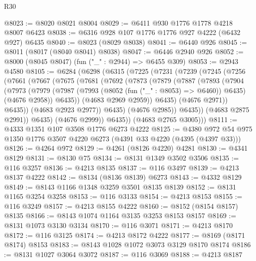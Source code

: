 \begin{lexlean}{R30}
\begin{coremodule}
{{{{{@8023 := @8020 @8021 @8004
@8029 := @6411 @930 @1776 @1778 @4218 @8007 @6423
@8038 := @6316 @928 @107 @1776 @1776 @927 @4222 (@6432 @927) @6435
@8040 := @8023 (@8029 @8038)
@8041 := @6440 @926
@8045 := @8011 (@8017 (@8040 @8041) @8038)
@8047 := @6446 @2940 @926
@8052 := @8000 (@8045 @8047) (fun ("_" : @2944) => @6455 @309)
@8053 := @2943 @4580
@8105 := @6284
    (@6298
      (@6315
        (@7225
          (@7231
            (@7239
              (@7245
                (@7256
                  (@7661
                    (@7667
                      (@7675
                        (@7681
                          (@7692
                            (@7873
                              (@7879
                                (@7887
                                  (@7893
                                    (@7904
                                      (@7973
                                        (@7979
                                          (@7987
                                            (@7993 (@8052 (fun ("_" : @8053) => @6460)) @6435)
                                            (@4676 @2958))
                                          @6435))
                                      (@4683 @2969 @2959))
                                    @6435)
                                  (@4676 @2971))
                                @6435))
                            (@4683 @2923 @2977))
                          @6435)
                        (@4676 @2985))
                      @6435))
                  (@4683 @2875 @2991))
                @6435)
              (@4676 @2999))
            @6435))
        (@4683 @2765 @3005)))
@8111 := @4333 @1351 @107 @3508 @1776 @6273 @4222
@8125 := @4380 @972 @54 @975 @1350 @1776 @3507 @4220 @6273 (@4391 @33 @4220 (@4395 (@4397 @33)))
@8126 := @4264 @972
@8129 := @4261 (@8126 @4220) @4281
@8130 := @4341 @8129
@8131 := @8130 @75
@8134 := @8131 @1349 @3502 @3506
@8135 := @116 @3257
@8136 := @4213 @8135
@8137 := @116 @3497
@8139 := @4213 @8137 @4222
@8142 := @8134 (@8136 @8139) @6273
@8143 := @4332 @8129
@8149 := @8143 @1166 @1348 @3259 @3501 @8135 @8139
@8152 := @8131 @1165 @3254 @3258
@8153 := @116 @3133
@8154 := @4213 @8153
@8155 := @116 @3249
@8157 := @4213 @8155 @4222
@8160 := @8152 (@8154 @8157) @8135
@8166 := @8143 @1074 @1164 @3135 @3253 @8153 @8157
@8169 := @8131 @1073 @3130 @3134
@8170 := @116 @3071
@8171 := @4213 @8170
@8172 := @116 @3125
@8174 := @4213 @8172 @4222
@8177 := @8169 (@8171 @8174) @8153
@8183 := @8143 @1028 @1072 @3073 @3129 @8170 @8174
@8186 := @8131 @1027 @3064 @3072
@8187 := @116 @3069
@8188 := @4213 @8187
}}}}}
\end{coremodule}
\end{lexlean}
